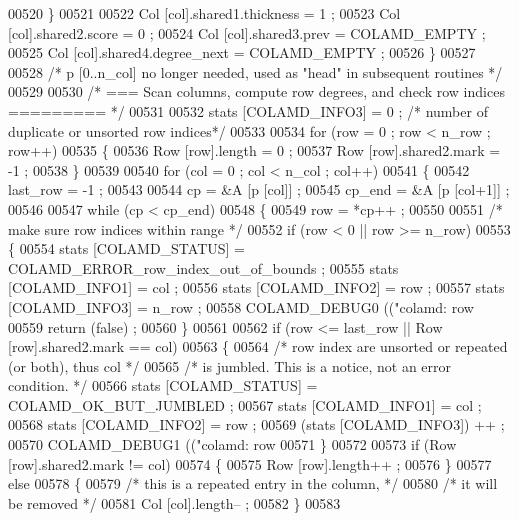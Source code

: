 \begin{DoxyCode}
{{{{{{{{00520     \}
00521 
00522     Col [col].shared1.thickness = 1 ;
00523     Col [col].shared2.score = 0 ;
00524     Col [col].shared3.prev = COLAMD\_EMPTY ;
00525     Col [col].shared4.degree\_next = COLAMD\_EMPTY ;
00526   \}
00527 
00528   \textcolor{comment}{/* p [0..n\_col] no longer needed, used as "head" in subsequent routines */}
00529 
00530   \textcolor{comment}{/* === Scan columns, compute row degrees, and check row indices ========= */}
00531 
00532   stats [COLAMD\_INFO3] = 0 ;  \textcolor{comment}{/* number of duplicate or unsorted row indices*/}
00533 
00534   \textcolor{keywordflow}{for} (row = 0 ; row < n\_row ; row++)
00535   \{
00536     Row [row].length = 0 ;
00537     Row [row].shared2.mark = -1 ;
00538   \}
00539 
00540   \textcolor{keywordflow}{for} (col = 0 ; col < n\_col ; col++)
00541   \{
00542     last\_row = -1 ;
00543 
00544     cp = &A [p [col]] ;
00545     cp\_end = &A [p [col+1]] ;
00546 
00547     \textcolor{keywordflow}{while} (cp < cp\_end)
00548     \{
00549       row = *cp++ ;
00550 
00551       \textcolor{comment}{/* make sure row indices within range */}
00552       \textcolor{keywordflow}{if} (row < 0 || row >= n\_row)
00553       \{
00554     stats [COLAMD\_STATUS] = COLAMD\_ERROR\_row\_index\_out\_of\_bounds ;
00555     stats [COLAMD\_INFO1] = col ;
00556     stats [COLAMD\_INFO2] = row ;
00557     stats [COLAMD\_INFO3] = n\_row ;
00558     COLAMD\_DEBUG0 ((\textcolor{stringliteral}{"colamd: row %
00559     \textcolor{keywordflow}{return} (\textcolor{keyword}{false}) ;
00560       \}
00561 
00562       \textcolor{keywordflow}{if} (row <= last\_row || Row [row].shared2.mark == col)
00563       \{
00564     \textcolor{comment}{/* row index are unsorted or repeated (or both), thus col */}
00565     \textcolor{comment}{/* is jumbled.  This is a notice, not an error condition. */}
00566     stats [COLAMD\_STATUS] = COLAMD\_OK\_BUT\_JUMBLED ;
00567     stats [COLAMD\_INFO1] = col ;
00568     stats [COLAMD\_INFO2] = row ;
00569     (stats [COLAMD\_INFO3]) ++ ;
00570     COLAMD\_DEBUG1 ((\textcolor{stringliteral}{"colamd: row %
00571       \}
00572 
00573       \textcolor{keywordflow}{if} (Row [row].shared2.mark != col)
00574       \{
00575     Row [row].length++ ;
00576       \}
00577       \textcolor{keywordflow}{else}
00578       \{
00579     \textcolor{comment}{/* this is a repeated entry in the column, */}
00580     \textcolor{comment}{/* it will be removed */}
00581     Col [col].length-- ;
00582       \}
00583 
}}}}}}}}}}
\end{DoxyCode}
